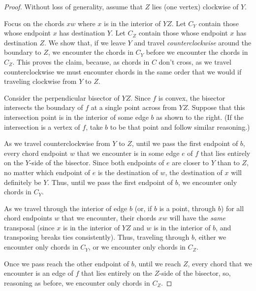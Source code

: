 \documentclass[final]{siamltex}
\newcommand{\edge}{e}
\newcommand{\face}{f}
\begin{document}
\begin{proof}
Without loss of generality, assume that $Z$ lies (one vertex) clockwise of $Y$.
\begin{window}
\noindent Focus on the chords $xw$ where $x$ is in the interior of $Y Z$.
Let $C_{Y}$ contain those whose endpoint $x$ has destination $Y$.
Let $C_{Z}$ contain those whose endpoint $x$ has destination $Z$.
We show that, if we leave $Y$ and travel {\em counterclockwise} around the boundary to $Z$,
we encounter the chords in $C_Y$ before we encounter the chords in $C_Z$.
This proves the claim, because, as chords in $C$ don't cross, 
as we travel counterclockwise
we must encounter chords in the same order
that we would if traveling clockwise from $Y$ to $Z$.
\end{window}

\begin{window}
Consider the perpendicular bisector of $Y Z$.
Since $\face$ is convex, the bisector intersects the boundary of $\face$
at a single point across from $Y Z$.
Suppose that this intersection point is in the interior of some edge $b$
as shown to the right.  
(If the intersection is a vertex of $\face$, take $b$ to be that point
and follow similar reasoning.)

\hspace*{\parindent}As we travel counterclockwise from $Y$ to $Z$,
until we pass the first endpoint of $b$, every chord endpoint $w$ that we encounter 
is in some edge $\edge$ of $\face$ that lies entirely on the $Y$-side of the bisector.
Since both endpoints of $\edge$ are closer to $Y$ than to $Z$,
no matter which endpoint of $\edge$ is the destination of $w$,
the destination of $x$ will definitely be $Y$.
Thus, until we pass the first endpoint of $b$, we encounter only chords in $C_{Y}$.
\end{window}

As we travel through the interior of edge $b$ (or, if $b$ is a point, through $b$)
for all chord endpoints $w$ that we encounter,
their chords $xw$ will have the {\em same} transposal
(since $x$ is in the interior of $Y Z$ 
and $w$ is in the interior of $b$, and transposing breaks ties consistently).
Thus, traveling through $b$, either we encounter only chords in $C_{Y}$,
or we encounter only chords in $C_{Z}$.

Once we pass reach the other endpoint of $b$, until we reach $Z$,
every chord that we encounter
is an edge of $\face$ that lies entirely on the $Z$-side of the bisector,
so, reasoning as before, we encounter only chords in $C_Z$.
\end{proof}
\end{document}
